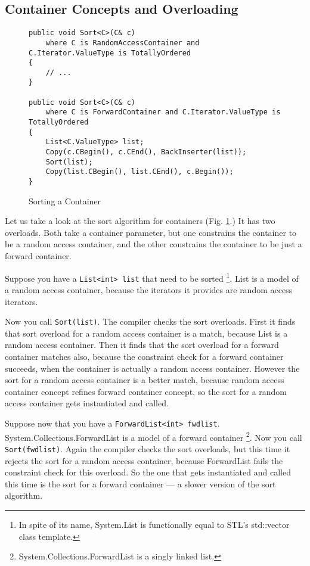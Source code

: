 \documentclass[oneside, a4paper, 11pt]{article}
\begin{document}
\subsection{Container Concepts and Overloading}

\begin{figure}[htb]\caption{Sorting a Container}\label{fig:sort}
\begin{lstlisting}[frame=trBL]
public void Sort<C>(C& c)
    where C is RandomAccessContainer and C.Iterator.ValueType is TotallyOrdered
{
    // ...
}

public void Sort<C>(C& c)
    where C is ForwardContainer and C.Iterator.ValueType is TotallyOrdered
{
    List<C.ValueType> list;
    Copy(c.CBegin(), c.CEnd(), BackInserter(list));
    Sort(list);
    Copy(list.CBegin(), list.CEnd(), c.Begin());
}
\end{lstlisting}
\end{figure}

Let us take a look at the sort algorithm for containers (Fig. \ref{fig:sort}.)
It has two overloads. Both take a container parameter, but one constrains the container
to be a random access container, and the other constrains the container
to be just a forward container.

Suppose you have a \verb|List<int> list| that need to be sorted
\footnote{In spite of its name, System.List is functionally equal to
STL's std::vector class template.}.
List is a model of a random access container, because the iterators it provides are
random access iterators.

Now you call \verb|Sort(list)|. The compiler checks the sort overloads.
First it finds that sort overload for a random access container is a match,
because List is a random access container. Then it finds that the sort overload for
a forward container matches also, because the constraint check for a forward
container succeeds, when the container is actually a random access container.
However the sort for a random access container is a better match,
because random access container concept refines forward container concept,
so the sort for a random access container gets instantiated and called.

Suppose now that you have a \verb|ForwardList<int> fwdlist|.
System.Collections.ForwardList is a model of a forward container
\footnote{System.Collections.ForwardList is a singly linked list.}.
Now you call \verb|Sort(fwdlist)|. Again the compiler checks the sort overloads,
but this time it rejects the sort for a random access container, because
ForwardList fails the constraint check for this overload.
So the one that gets instantiated and called this time is the sort for a forward
container --- a slower version of the sort algorithm.
\end{document}
